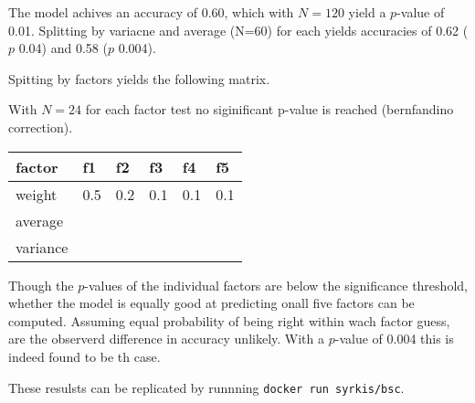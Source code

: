 The model achives an accuracy of 0.60, which with $N=120$ yield a $p$-value of 0.01.
Splitting by variacne and average (N=60) for each yields accuracies of 0.62 ($p$ 0.04) and 0.58 ($p$ 0.004).

Spitting by factors yields the following matrix.

With $N=24$ for each factor test no siginificant p-value is reached (bernfandino correction). 

\begin{table}[H]
\centering
\begin{tabular}{|l|l|l|l|l|l|} 
\hline
factor & f1 & f2 & f3 & f4 & f5 \\ 
\hline
weight & 0.5 & 0.2 & 0.1 & 0.1 & 0.1 \\ 
\hline
average &  &  &  &  &   \\
\hline
variance &  &  &  &  &   \\
\hline
\end{tabular}
\end{table}

Though the $p$-values of the individual factors are below the significance threshold, whether the model is equally good at predicting onall five factors can be computed.
Assuming equal probability of being right within wach factor guess, are the observerd difference in accuracy unlikely.
With a $p$-value of 0.004 this is indeed found to be th case.

These resulsts can be replicated by runnning \texttt{docker run syrkis/bsc}.
